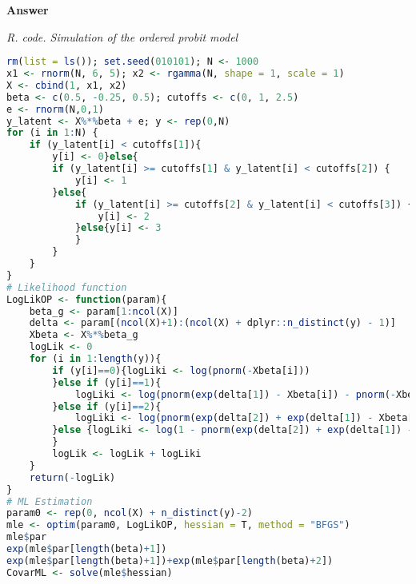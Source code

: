 \begin{enumerate}[leftmargin=*]
\textbf{Answer}

\begin{tcolorbox}[enhanced,width=4.67in,center upper,
	fontupper=\large\bfseries,drop shadow southwest,sharp corners]
	\textit{R. code. Simulation of the ordered probit model}
	\begin{VF}
		\begin{lstlisting}[language=R]
rm(list = ls()); set.seed(010101); N <- 1000
x1 <- rnorm(N, 6, 5); x2 <- rgamma(N, shape = 1, scale = 1)
X <- cbind(1, x1, x2)
beta <- c(0.5, -0.25, 0.5); cutoffs <- c(0, 1, 2.5)
e <- rnorm(N,0,1)
y_latent <- X%*%beta + e; y <- rep(0,N)
for (i in 1:N) {
	if (y_latent[i] < cutoffs[1]){
		y[i] <- 0}else{
		if (y_latent[i] >= cutoffs[1] & y_latent[i] < cutoffs[2]) {
			y[i] <- 1
		}else{
			if (y_latent[i] >= cutoffs[2] & y_latent[i] < cutoffs[3]) {
				y[i] <- 2
			}else{y[i] <- 3
			}
		}
	}
}
# Likelihood function
LogLikOP <- function(param){
	beta_g <- param[1:ncol(X)]
	delta <- param[(ncol(X)+1):(ncol(X) + dplyr::n_distinct(y) - 1)]
	Xbeta <- X%*%beta_g
	logLik <- 0
	for (i in 1:length(y)){
		if (y[i]==0){logLiki <- log(pnorm(-Xbeta[i]))
		}else if (y[i]==1){
			logLiki <- log(pnorm(exp(delta[1]) - Xbeta[i]) - pnorm(-Xbeta[i]))
		}else if (y[i]==2){
			logLiki <- log(pnorm(exp(delta[2]) + exp(delta[1]) - Xbeta[i]) - pnorm(exp(delta[1]) - Xbeta[i]))
		}else {logLiki <- log(1 - pnorm(exp(delta[2]) + exp(delta[1]) - Xbeta[i]))
		}
		logLik <- logLik + logLiki
	}
	return(-logLik)
}
# ML Estimation
param0 <- rep(0, ncol(X) + n_distinct(y)-2)
mle <- optim(param0, LogLikOP, hessian = T, method = "BFGS")
mle$par
exp(mle$par[length(beta)+1])
exp(mle$par[length(beta)+1])+exp(mle$par[length(beta)+2])
CovarML <- solve(mle$hessian)
\end{lstlisting}
	\end{VF}
\end{tcolorbox} 


\end{enumerate}
